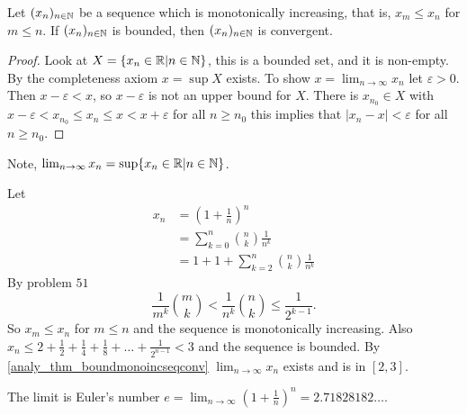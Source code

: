 \documentclass[10pt, a4paper]{article}
\newcommand{\seq}[1][x]{(#1_n)_{n \in \N}}
\begin{document}
\begin{theorem}\label{analy_thm_boundmonoincseqconv}
    Let $\seq$ be a sequence which is monotonically increasing,
    that is,
    $x_m \leq x_n$ for $m \leq n$.
    If $\seq$ is bounded,
    then $\seq$ is convergent.
    \begin{proof}
        Look at $X = \{x_n \in \mathbb{R} | n \in \mathbb{N}\}$,
        this is a bounded set,
        and it is non-empty.
        By the completeness axiom $x = \sup X$ exists.
        To show $x = \lim_{n \rightarrow \infty}x_n$
        let $\varepsilon > 0$.
        Then $x - \varepsilon < x$,
        so $x - \varepsilon$ is not an upper bound for $X$.
        There is $x_{n_0} \in X$ with
        $x - \varepsilon < x_{n_0} \leq x_n \leq x < x + \varepsilon$ for all $n \geq n_0$
        this implies that
        $|x_n - x| < \varepsilon$ for all $n \geq n_0$.
    \end{proof}
\end{theorem}
Note, $\lim_{n \rightarrow \infty}x_n = \sup\{x_n \in \mathbb{R} | n \in \mathbb{N}\}$.
\begin{example}
    Let
    \begin{align*}
        x_n &= \left(1 + \frac{1}{n}\right) ^ n \\
        &= \sum_{k = 0}^{n}\binom{n}{k}\frac{1}{n ^ k} \\
        &= 1 + 1 + \sum_{k = 2}^{n}\binom{n}{k}\frac{1}{n ^ k}
    \end{align*}
    By problem $51$
    \[
    \frac{1}{m ^ k}\binom{m}{k} < \frac{1}{n ^ k}\binom{n}{k} \leq \frac{1}{2 ^ {k - 1}}.
    \]
    So $x_m \leq x_n$ for $m \leq n$ and the sequence is monotonically increasing.
    Also $x_n \leq 2 + \frac{1}{2} + \frac{1}{4} + \frac{1}{8} + \dotsc + \frac{1}{2 ^ {n - 1}} < 3$
    and the sequence is bounded.
    By \autoref{analy_thm_boundmonoincseqconv} $\lim_{n \rightarrow \infty}x_n$ exists and is in $[2, 3]$.
    
    The limit is Euler's number $e = \displaystyle\lim_{n \rightarrow \infty}\left(1 + \frac{1}{n}\right) ^ n = 2.71828182\dotsc$.
\end{example}
\end{document}
